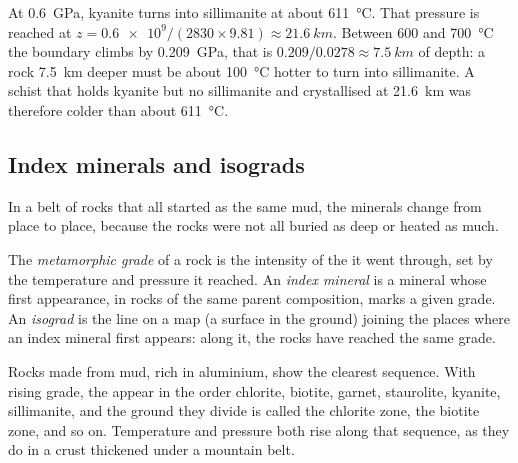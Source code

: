 \begin{example}\label{ex:g12:metamorphic-rocks:kysil}
At \qty{0.6}{GPa}, kyanite turns into sillimanite at about
\qty{611}{\celsius}. That pressure is reached at $z = \num{0.6e9} / (2830
\times 9.81) \approx \qty{21.6}{km}$. Between 600 and \qty{700}{\celsius}
the boundary climbs by \qty{0.209}{GPa}, that is $0.209/0.0278 \approx
\qty{7.5}{km}$ of depth: a rock \qty{7.5}{km} deeper must be about
\qty{100}{\celsius} hotter to turn into sillimanite. A schist that holds
kyanite but no sillimanite and crystallised at \qty{21.6}{km} was therefore
colder than about \qty{611}{\celsius}.
\end{example}

\subsection{Index minerals and isograds}

In a belt of rocks that all started as the same mud, the minerals change
from place to place, because the rocks were not all buried as deep or heated
as much.

\begin{definition}\label{def:g12:metamorphic-rocks:index-mineral}
The \emph{metamorphic grade} of a rock is the
intensity of the  it went through, set by the temperature and
pressure it reached. An \emph{index mineral} is a
mineral whose first appearance, in rocks of the same parent composition,
marks a given grade. An \emph{isograd} is the line on a map
(a surface in the ground) joining the places where an index mineral first
appears: along it, the rocks have reached the same grade.
\end{definition}

Rocks made from mud, rich in aluminium, show the clearest sequence. With
rising grade, the  appear in the order chlorite, biotite,
garnet, staurolite, kyanite, sillimanite, and the ground they divide is
called the chlorite zone, the biotite zone, and so on. Temperature and
pressure both rise along that sequence, as they do in a crust thickened
under a mountain belt.

